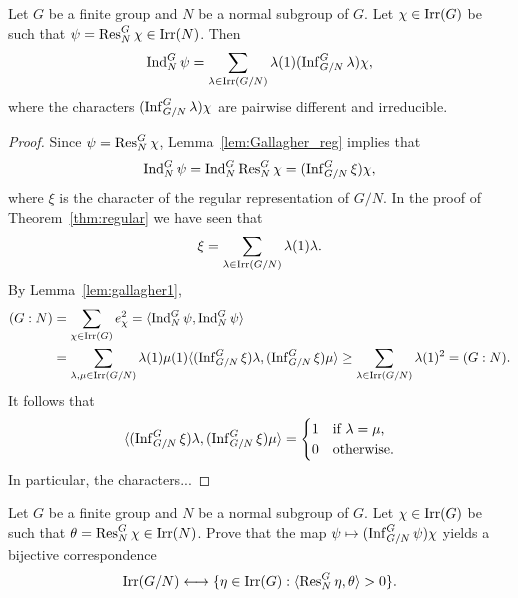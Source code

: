 \begin{theorem}[Gallagher]
\label{thm:Gallagher}
    Let $G$ be a finite group and $N$ be a normal subgroup of $G$. 
    Let $\chi\in\operatorname{Irr}(G)$ be such that $\psi=\operatorname{Res}_N^G\chi\in\operatorname{Irr}(N)$. Then
    \[
    \operatorname{Ind}_N^G\psi=\sum_{\lambda\in\operatorname{Irr}(G/N)}\lambda(1)(\operatorname{Inf}_{G/N}^G\lambda)\chi,
    \]
    where the characters $(\operatorname{Inf}_{G/N}^G\lambda)\chi$ are pairwise different and irreducible. 
\end{theorem}

\begin{proof}
    Since $\psi=\operatorname{Res}_N^G\chi$, Lemma~\ref{lem:Gallagher_reg} implies that 
    \[
    \operatorname{Ind}_N^G\psi=\operatorname{Ind}_N^G\operatorname{Res}_N^G\chi=(\operatorname{Inf}_{G/N}^G\xi)\chi,
    \]
    where $\xi$ is the character of the regular representation of $G/N$. In the proof
    of Theorem~\ref{thm:regular} we have seen that
    \[
    \xi=\sum_{\lambda\in\operatorname{Irr}(G/N)}\lambda(1)\lambda. 
    \]
    By Lemma~\ref{lem:gallagher1}, 
    \begin{align*}
        (G:N)&=\sum_{\chi\in\operatorname{Irr}(G)}e_\chi^2
        =\langle\operatorname{Ind}_N^G\psi,\operatorname{Ind}_N^G\psi\rangle\\
        &=\sum_{\lambda,\mu\in\operatorname{Irr}(G/N)}\lambda(1)\mu(1)\langle(\operatorname{Inf}_{G/N}^G\xi)\lambda,(\operatorname{Inf}_{G/N}^G\xi)\mu\rangle
        \geq\sum_{\lambda\in\operatorname{Irr}(G/N)}\lambda(1)^2=(G:N).        
    \end{align*}
    It follows that 
    \[
    \langle(\operatorname{Inf}_{G/N}^G\xi)\lambda,(\operatorname{Inf}_{G/N}^G\xi)\mu\rangle=\begin{cases}
        1 & \text{if $\lambda=\mu$,}\\
        0 & \text{otherwise.}
    \end{cases}
    \]
    In particular, the characters...
\end{proof}

\begin{exercise}
    Let $G$ be a finite group and $N$ be a normal subgroup of $G$. Let $\chi\in\operatorname{Irr}(G)$ 
    be such that $\theta=\operatorname{Res}_N^G\chi\in\operatorname{Irr}(N)$. Prove that the map 
    $\psi\mapsto(\operatorname{Inf}_{G/N}^G\psi)\chi$ yields 
    a bijective 
    correspondence 
    \[
    \operatorname{Irr}(G/N)\longleftrightarrow\{\eta\in\operatorname{Irr}(G):\langle\operatorname{Res}_N^G\eta,\theta\rangle>0\}.
    \]
\end{exercise}